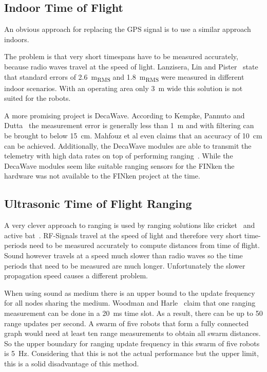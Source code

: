 
\subsection{Indoor Time of Flight}
An obvious approach for replacing the GPS signal is to use a similar approach indoors.

The problem is that very short timespans have to be measured accurately, because radio waves travel at the speed of light.
Lanzisera, Lin and Pister~\cite{lanzisera2006} state that standard errors of \SI{2.6}{\metre_{RMS}} and \SI{1.8}{\metre_{RMS}} were measured in different indoor scenarios.
With an operating area only \SI{3}{\metre} wide this solution is not suited for the robots.

A more promising project is DecaWave.
According to Kempke, Pannuto and Dutta~\cite{uwb_localisation_copter} the measurement error is generally less than \SI{1}{\metre} and with filtering can be brought to below \SI{15}{\centi\metre}.
Mahfouz et al\cite{uwb_decawave} even claims that an accuracy of \SI{10}{\centi\metre} can be achieved.
Additionally, the DecaWave modules are able to transmit the telemetry with high data rates on top of performing ranging~\cite{decawaveweb}.
While the DecaWave modules seem like suitable ranging sensors for the FINken the hardware was not available to the FINken project at the time.

\subsection{Ultrasonic Time of Flight Ranging}
A very clever approach to ranging is used by ranging solutions like cricket~\cite{cricket_01} and active bat~\cite{active_bat}. 
RF-Signals travel at the speed of light and therefore very short time-periods need to be measured accurately to compute distances from time of flight.
Sound however travels at a speed much slower than radio waves so the time periods that need to be measured are much longer.
Unfortunately the slower propagation speed causes a different problem.

When using sound as medium there is an upper bound to the update frequency for all nodes sharing the medium. Woodman and Harle~\cite{active_bat} claim that one ranging measurement can be done in a \SI{20}{\milli\second} time slot.
As a result, there can be up to 50 range updates per second.
A swarm of five robots that form a fully connected graph would need at least ten range measurements to obtain all swarm distances.
So the upper boundary for ranging update frequency in this swarm of five robots is \SI{5}{\hertz}.
Considering that this is not the actual performance but the upper limit, this is a solid disadvantage of this method.

